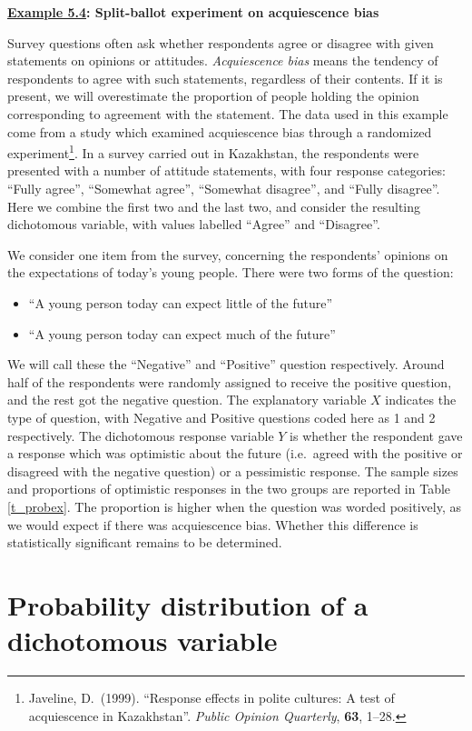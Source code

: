 \textbf{\underline{Example 5.4}:
Split-ballot experiment on acquiescence bias}

Survey questions often ask whether respondents agree or disagree with
given statements on opinions or attitudes.
\emph{Acquiescence bias} means the tendency of respondents to agree
with such statements, regardless of their contents. If it is present, we
will overestimate the proportion of people holding the opinion
corresponding to agreement with the statement. The data used in this
example come from a study which examined acquiescence bias through a
randomized experiment\footnote{Javeline, D.\ (1999). ``Response effects
in polite cultures: A test of acquiescence in Kazakhstan''. \emph{Public
Opinion Quarterly}, \textbf{63}, 1--28.}. In a survey carried out in Kazakhstan, the respondents were
presented with a number of attitude statements, with four response
categories: ``Fully agree'', ``Somewhat agree'', ``Somewhat disagree'',
and ``Fully disagree''. Here we combine the first two and the last two,
and consider the resulting dichotomous variable, with values labelled
``Agree'' and ``Disagree''.

We consider one item from the survey, concerning the respondents'
opinions on the expectations of today's young people. There were two
forms of the question:
\begin{itemize}
\item
``A young person today can expect little of the future''
\item
``A young person today can expect much of the future''
\end{itemize}
We will call these the ``Negative'' and ``Positive'' question
respectively.
Around half of the respondents were randomly assigned to receive the
positive question, and the rest got the negative question.
The explanatory variable $X$ indicates the type of question,
with Negative and Positive questions coded here as 1 and 2
respectively. The dichotomous response variable $Y$
is whether the
respondent gave a response which was optimistic about the future
(i.e.\ agreed with the positive or disagreed with the negative
question) or a pessimistic response.
The sample sizes and proportions
of optimistic responses in the two
groups are reported in Table \ref{t_probex}. The proportion is higher when the question was worded positively, as we
would expect if there was acquiescence bias. Whether this difference is
statistically significant remains to be determined.

\section{Probability distribution of a dichotomous variable}
\label{s_probs_distribution}

